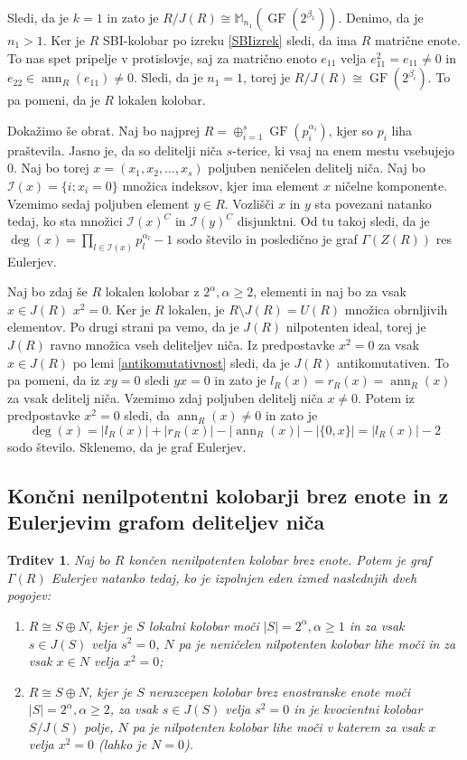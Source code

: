\documentclass[a4paper, 12pt]{amsart}
\theoremstyle{definition} %
\theoremstyle{plain} %
\newtheorem{trditev}[definicija]{Trditev}
\newcommand{\M}{\mathbb M}
\DeclareMathOperator{\ann}{ann}
\DeclareMathOperator{\GF}{GF}
\begin{document}
Sledi, da je $k=1$ in zato je $R/J(R) \cong \M_{n_1}(\GF(2^{\beta_1}))$. Denimo, da je $n_1 > 1$. Ker je $R$ SBI-kolobar po izreku \ref{SBIizrek} sledi, da ima $R$ matrične enote. To nas spet pripelje v protislovje, saj za matrično enoto $e_{11}$ velja $e_{11}^2 = e_{11} \neq 0$ in $e_{22}\in \ann_R(e_{11}) \neq 0$. Sledi, da je $n_1 = 1$, torej je $R/J(R) \cong \GF(2^{\beta_i})$. To pa pomeni, da je $R$  lokalen kolobar.

Dokažimo še obrat. Naj bo najprej $R= \oplus_{i=1}^s \GF(p_i^{\alpha_i})$, kjer so $p_i$ liha praštevila. Jasno je, da so delitelji niča $s$-terice, ki vsaj na enem mestu vsebujejo 0. Naj bo torej $x=(x_1,x_2,\dots,x_s)$ poljuben neničelen delitelj  niča. Naj bo $\mathcal{I}(x)=\{i;x_i=0\}$ množica indeksov, kjer ima element $x$ ničelne komponente. Vzemimo sedaj poljuben element $y\in R$. Vozlišči $x$ in $y$ sta povezani natanko tedaj, ko sta množici $\mathcal{I}(x)^C$ in $\mathcal{I}(y)^C$ disjunktni. Od tu takoj sledi, da je $\deg(x) = \prod_{l\in \mathcal{I}(x)} p_l^{\alpha_l}-1$ sodo število in posledično je graf $\Gamma(Z(R))$ res Eulerjev.

Naj bo zdaj še $R$ lokalen kolobar z $2^\alpha, \alpha \ge 2$, elementi in naj bo za vsak $x\in J(R)$ $ x^2 = 0$. Ker je $R$ lokalen,  je $R\setminus J(R)=U(R)$ množica obrnljivih elementov. Po drugi strani pa vemo, da je $J(R)$ nilpotenten ideal, torej je $J(R)$ ravno množica vseh deliteljev niča. Iz predpostavke $x^2 = 0$ za vsak $x\in J(R)$ po lemi \ref{antikomutativnost} sledi, da je $J(R)$ antikomutativen. To pa pomeni, da iz $xy = 0$ sledi $yx=0$ in zato je $l_R(x) = r_R(x) = \ann_R(x)$ za vsak delitelj niča. Vzemimo zdaj poljuben delitelj niča $x\neq 0$. Potem iz predpostavke $x^2 = 0$ sledi, da $\ann_R(x)\neq 0$ in zato je 
$$
\deg(x) = |l_R(x)| + |r_R(x)| -| \ann_R(x) | - |\{0,x\}| = |l_R(x)| -2 
$$
sodo število. Sklenemo, da je graf Eulerjev. 
\endproof

\subsection{Končni nenilpotentni kolobarji brez enote in z Eulerjevim grafom deliteljev niča}

\begin{trditev}
\label{EulerBrezEnote}
Naj bo $R$ končen nenilpotenten kolobar brez enote. Potem je graf $\Gamma(R)$ Eulerjev natanko tedaj, ko je izpolnjen eden izmed naslednjih dveh pogojev:
\begin{enumerate}
\item $R\cong S \oplus N$, kjer je $S$ lokalni kolobar moči $|S| = 2^{\alpha}, \alpha \ge 1$ in za vsak $s\in J(S)$ velja $s^2 = 0$, $N$ pa je neničelen nilpotenten kolobar lihe moči in za vsak $x\in N$ velja $x^2 = 0$;
\item $R\cong S\oplus N$, kjer je $S$ nerazcepen kolobar brez enostranske enote moči $|S| = 2^{\alpha}, \alpha\ge 2$, za vsak $s\in J(S)$ velja $s^2 = 0$ in je kvocientni kolobar $S/J(S)$ polje, $N$ pa je nilpotenten kolobar lihe moči v katerem za vsak $x$ velja $x^2 =0 $ (lahko je $N=0$). 
\end{enumerate}
\end{trditev}
\end{document}
